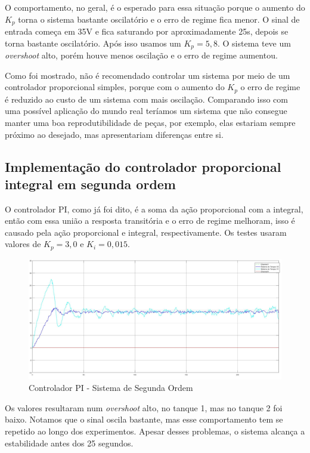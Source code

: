 \documentclass[
	12pt,				%
	openany,			%
	oneside,			%
	a4paper,			%
	english,			%
	french,				%
	spanish,			%
	brazil,				%
	]{abntex2}
\begin{document}
{O comportamento, no geral, é o esperado para essa situação porque o aumento do $K_p$ torna o sistema bastante oscilatório e o erro de regime fica menor. O sinal de entrada começa em 35V e fica saturando por aproximadamente 25s, depois se torna bastante oscilatório. Após isso usamos um $K_p=5,8$. O sistema teve um \textit{overshoot} alto, porém houve menos oscilação e o erro de regime aumentou. 

Como foi mostrado, não é recomendado controlar um sistema por meio de um controlador proporcional simples, porque com o aumento do $K_p$ o erro de regime é reduzido ao custo de um sistema com mais oscilação. Comparando isso com uma possível aplicação do mundo real teríamos um sistema que não consegue manter uma boa reprodutibilidade de peças, por exemplo, elas estariam sempre próximo ao desejado, mas apresentariam diferenças entre si. 

\subsection{Implementação do controlador proporcional integral em segunda ordem}

O controlador PI, como já foi dito, é a soma da ação proporcional com a integral, então com essa união a resposta transitória e o erro de regime melhoram, isso é causado pela ação proporcional e integral, respectivamente. Os testes usaram valores de $K_p=3,0$ e $K_i=0,015$.

\begin{figure}[h]
	\centering
	\includegraphics[scale=0.25]{9 - pi_1_segunda_ordem.jpg}
	\caption{Controlador PI - Sistema de Segunda Ordem}
\end{figure}

Os valores resultaram num \textit{overshoot} alto, no tanque 1, mas no tanque 2 foi baixo. Notamos que o sinal oscila bastante, mas esse comportamento tem se repetido ao longo dos experimentos. Apesar desses problemas, o sistema alcança a estabilidade antes dos 25 segundos.

}
\end{document}
